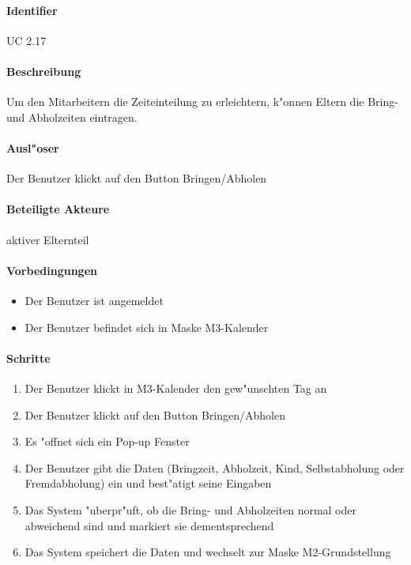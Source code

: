  \paragraph{Identifier}
  UC 2.17
  \paragraph{Beschreibung}
  Um den Mitarbeitern die Zeiteinteilung zu erleichtern, k"onnen Eltern die Bring- und Abholzeiten eintragen.
  \paragraph{Ausl"oser}
  Der Benutzer klickt auf den Button \dq Bringen/Abholen\dq
  \paragraph{Beteiligte Akteure}   \leavevmode \newline
    aktiver Elternteil
  \paragraph{Vorbedingungen}
  \begin{itemize}
   \item Der Benutzer ist angemeldet
   \item Der Benutzer befindet sich in Maske M3-Kalender
  \end{itemize}

  \paragraph{Schritte}
  \begin{enumerate}
   \item Der Benutzer klickt in M3-Kalender den gew"unschten Tag an
   \item Der Benutzer klickt auf den Button \dq Bringen/Abholen\dq
   \item Es "offnet sich ein Pop-up Fenster
   \item Der Benutzer gibt die Daten (Bringzeit, Abholzeit, Kind, Selbstabholung oder Fremdabholung) ein und best"atigt seine Eingaben
   \item Das System "uberpr"uft, ob die Bring- und Abholzeiten normal oder abweichend sind und markiert sie dementsprechend
   \item Das System speichert die Daten und wechselt zur Maske M2-Grundstellung
  \end{enumerate}

